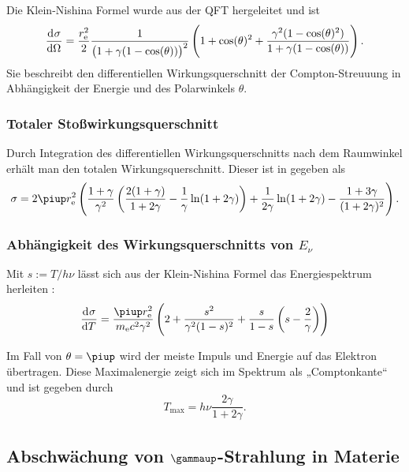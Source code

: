 \documentclass[11pt, ngerman, fleqn, DIV=15, headinclude, BCOR=2cm]{scrreprt}
\begin{document}
Die Klein-Nishina Formel wurde aus der QFT hergeleitet und ist
\parencite[(2.107)]{Leo/Techniques_Nuclear_Experiments}
\[
    \dod\sigma\Omega =
    \frac{r_\text e^2}2 \frac1{\del{1 + \gamma(1 - \cos(\theta))}^2}
    \del{
        1 + \cos(\theta)^2 + \frac{\gamma^2(1 - \cos(\theta)^2)}{1 + \gamma(1 -
        \cos(\theta))}
    }.
\]
Sie beschreibt den differentiellen Wirkungsquerschnitt der Compton-Streuuung in
Abhängigkeit der Energie und des
Polarwinkels $\theta$.

\subsubsection{Totaler Stoßwirkungsquerschnitt}

Durch Integration des differentiellen Wirkungsquerschnitts nach dem Raumwinkel
erhält man den totalen Wirkungsquerschnitt. Dieser ist in
\parencite[(2.107)]{Leo/Techniques_Nuclear_Experiments} gegeben als
\[
    \sigma = 2 \piup r_\text e^2 \del{
        \frac{1+\gamma}{\gamma^2} \del{
            \frac{2(1+\gamma)}{1+2\gamma} - \frac1\gamma \ln(1+2\gamma)
        }
        + \frac1{2\gamma} \ln(1+2\gamma) - \frac{1+3\gamma}{(1+2\gamma)^2}
    }.
\]

\subsubsection{Abhängigkeit des Wirkungsquerschnitts von $E_\nu$}

Mit $s := T / h \nu$ lässt sich aus der Klein-Nishina Formel das
Energiespektrum herleiten
\parencite[(2.113)]{Leo/Techniques_Nuclear_Experiments}:
\[
    \dod\sigma T =
    \frac{\piup r_\text e^2}{m_\text e c^2 \gamma^2} \del{
        2 + \frac{s^2}{\gamma^2(1 - s)^2} + \frac{s}{1-s} \del{
            s - \frac2\gamma
        }
    }
\]

Im Fall von $\theta = \piup$ wird der meiste Impuls und Energie auf das
Elektron übertragen. Diese Maximalenergie zeigt sich im Spektrum als
„Comptonkante“ und ist gegeben durch
\parencite[(2.114)]{Leo/Techniques_Nuclear_Experiments}
\[
    T_\text{max} = h \nu \frac{2\gamma}{1+2\gamma}.
\]


\subsection{Abschwächung von $\boldsymbol\gammaup$-Strahlung in Materie}
\end{document}
